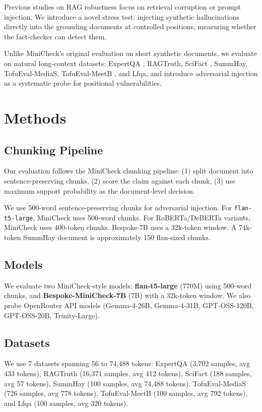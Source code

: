 \documentclass{article}
\begin{document}
Previous studies on RAG robustness focus on retrieval corruption or prompt injection. We introduce a novel stress test: injecting synthetic hallucinations directly into the grounding documents at controlled positions, measuring whether the fact-checker can detect them.

Unlike MiniCheck's original evaluation on short synthetic documents, we evaluate on natural long-context datasets: ExpertQA \citep{malaviya2024expertqa}, RAGTruth, SciFact \citep{wadden2020fact}, SummHay, TofuEval-MediaS, TofuEval-MeetB \citep{tang2024tofueval}, and Lfqa, and introduce adversarial injection as a systematic probe for positional vulnerabilities.

\section{Methods}

\subsection{Chunking Pipeline}

Our evaluation follows the MiniCheck chunking pipeline: (1) split document into sentence-preserving chunks, (2) score the claim against each chunk, (3) use maximum support probability as the document-level decision.

We use 500-word sentence-preserving chunks for adversarial injection. For \texttt{flan-t5-large}, MiniCheck uses 500-word chunks. For RoBERTa/DeBERTa variants, MiniCheck uses 400-token chunks. Bespoke-7B uses a 32k-token window. A 74k-token SummHay document is approximately 150 flan-sized chunks.

\subsection{Models}

We evaluate two MiniCheck-style models: \textbf{flan-t5-large} (770M) using 500-word chunks, and \textbf{Bespoke-MiniCheck-7B} (7B) with a 32k-token window. We also probe OpenRouter API models (Gemma-4-26B, Gemma-4-31B, GPT-OSS-120B, GPT-OSS-20B, Trinity-Large).

\subsection{Datasets}

We use 7 datasets spanning 56 to 74,488 tokens: ExpertQA \citep{malaviya2024expertqa} (3,702 samples, avg 433 tokens), RAGTruth (16,371 samples, avg 412 tokens), SciFact \citep{wadden2020fact} (188 samples, avg 57 tokens), SummHay (100 samples, avg 74,488 tokens), TofuEval-MediaS \citep{tang2024tofueval} (726 samples, avg 778 tokens), TofuEval-MeetB \citep{tang2024tofueval} (100 samples, avg 792 tokens), and Lfqa (100 samples, avg 320 tokens).
\end{document}
